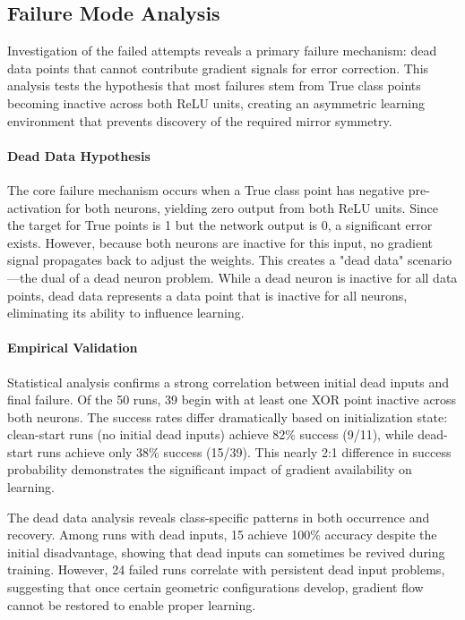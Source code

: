 \subsection*{Failure Mode Analysis}

Investigation of the failed attempts reveals a primary failure mechanism: dead data points that cannot contribute gradient signals for error correction. This analysis tests the hypothesis that most failures stem from True class points becoming inactive across both ReLU units, creating an asymmetric learning environment that prevents discovery of the required mirror symmetry.

\paragraph{Dead Data Hypothesis}
The core failure mechanism occurs when a True class point has negative pre-activation for both neurons, yielding zero output from both ReLU units. Since the target for True points is 1 but the network output is 0, a significant error exists. However, because both neurons are inactive for this input, no gradient signal propagates back to adjust the weights. This creates a "dead data" scenario—the dual of a dead neuron problem. While a dead neuron is inactive for all data points, dead data represents a data point that is inactive for all neurons, eliminating its ability to influence learning.

\paragraph{Empirical Validation}
Statistical analysis confirms a strong correlation between initial dead inputs and final failure. Of the 50 runs, 39 begin with at least one XOR point inactive across both neurons. The success rates differ dramatically based on initialization state: clean-start runs (no initial dead inputs) achieve 82\% success (9/11), while dead-start runs achieve only 38\% success (15/39). This nearly 2:1 difference in success probability demonstrates the significant impact of gradient availability on learning.

The dead data analysis reveals class-specific patterns in both occurrence and recovery. Among runs with dead inputs, 15 achieve 100\% accuracy despite the initial disadvantage, showing that dead inputs can sometimes be revived during training. However, 24 failed runs correlate with persistent dead input problems, suggesting that once certain geometric configurations develop, gradient flow cannot be restored to enable proper learning.

